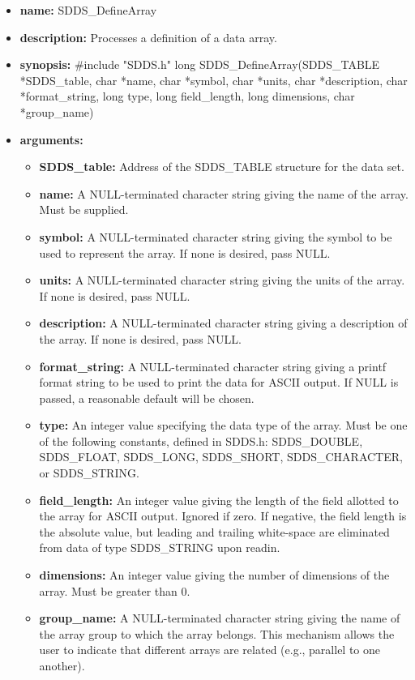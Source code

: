 \documentclass[11pt]{article}
\begin{document}
\begin{itemize}
\item {\bf name:}\newline
SDDS\_DefineArray
\item {\bf description:}\newline
Processes a definition of a data array.
\item {\bf synopsis:} \#include "SDDS.h"\newline
long SDDS\_DefineArray(SDDS\_TABLE *SDDS\_table, char *name, char *symbol, char *units, char *description, char *format\_string, long type, long field\_length, long dimensions, char *group\_name)
\item {\bf arguments:}
\begin{itemize}
\item {\bf SDDS\_table:} Address of the SDDS\_TABLE structure for the data set.
\item {\bf name:} A NULL-terminated character string giving the name of the array. Must be supplied.
\item {\bf symbol:} A NULL-terminated character string giving the symbol to be used to represent the array. If none is desired, pass NULL.
\item {\bf units:} A NULL-terminated character string giving the units of the array. If none is desired, pass NULL.
\item {\bf description:} A NULL-terminated character string giving a description of the array. If none is desired, pass NULL.
\item {\bf format\_string:} A NULL-terminated character string giving a  printf format string to be used to print the data for ASCII output. If NULL is passed, a reasonable default will be chosen.
\item {\bf type:} An integer value specifying the data type of the array. Must be one of the following constants, defined in  SDDS.h: SDDS\_DOUBLE, SDDS\_FLOAT, SDDS\_LONG, SDDS\_SHORT, SDDS\_CHARACTER, or SDDS\_STRING.
\item {\bf field\_length:} An integer value giving the length of the field allotted to the array for ASCII output. Ignored if zero. If negative, the field length is the absolute value, but leading and trailing white-space are eliminated from data of type SDDS\_STRING upon readin.
\item {\bf dimensions:} An integer value giving the number of dimensions of the array. Must be greater than 0.
\item {\bf group\_name:} A NULL-terminated character string giving the name of the array group to which the array belongs. This mechanism allows the user to indicate that different arrays are related (e.g., parallel to one another).

\end{itemize}
\end{itemize}
\end{document}

